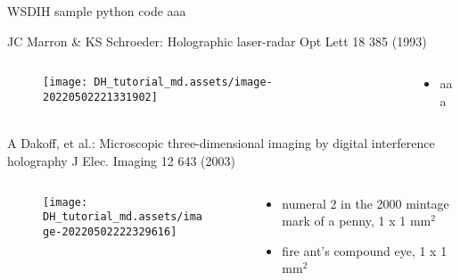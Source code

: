 \documentclass[t, aspectratio=169]{beamer}
\begin{document}
\begin{frame}{WSDIH sample python code}
aaa
\end{frame}


\begin{frame}{JC Marron \& KS Schroeder: Holographic laser-radar}
	\vspace{-3 mm}
	\small Opt Lett 18 385 (1993)
	\begin{columns}
		\begin{column}{.6\textwidth}
			\begin{figure}
				\texttt{[image: DH\_tutorial\_md.assets/image-20220502221331902]}
			\end{figure}
		\end{column}
		\begin{column}{.4\textwidth}
			\begin{itemize}
				\item aaa
			\end{itemize}
		\end{column}
	\end{columns}
\end{frame}


\begin{frame}{A Dakoff, et al.: Microscopic three-dimensional imaging by digital interference holography}
	\vspace{-3 mm}
	\small J Elec. Imaging 12 643 (2003)
	\begin{columns}
		\begin{column}{.6\textwidth}
			\begin{figure}
				\texttt{[image: DH\_tutorial\_md.assets/image-20220502222329616]}
			\end{figure}
		\end{column}
		\begin{column}{.4\textwidth}
			\begin{itemize}
				\item[a) ] numeral 2 in the 2000 mintage mark of a penny, 1 x 1 mm$^2$
				\item[b) ] fire ant's compound eye, 1 x 1 mm$^2$
			\end{itemize}
		\end{column}
	\end{columns}
\end{frame}
\end{document}
